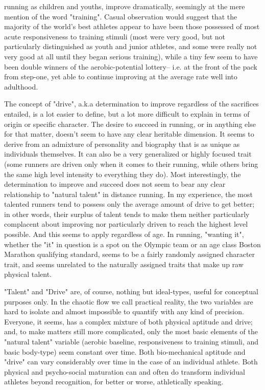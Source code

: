 running as children and youths, improve dramatically, seemingly at the mere mention of the word "training". Casual observation would suggest that the majority of the world's best athletes appear to have been those possessed of most acute responsiveness to training stimuli (most were very good, but not particularly distinguished as youth and junior athletes, and some were really not very good at all until they began serious training), while a tiny few seem to have been double winners of the aerobic-potential lottery-- i.e. at the front of the pack from step-one, yet able to continue improving at the average rate well into adulthood.

The concept of "drive", a.k.a determination to improve regardless of the sacrifices entailed, is a lot easier to define, but a lot more difficult to explain in terms of origin or specific character. The desire to succeed in running, or in anything else for that matter, doesn't seem to have any clear heritable dimension. It seems to derive from an admixture of personality and biography that is as unique as individuals themselves. It can also be a very generalized or highly focused trait (some runners are driven only when it comes to their running, while others bring the same high level intensity to everything they do). Most interestingly, the determination to improve and succeed does not seem to bear any clear relationship to "natural talent" in distance running. In my experience, the most talented runners tend to possess only the average amount of drive to get better; in other words, their surplus of talent tends to make them neither particularly complacent about improving nor particularly driven to reach the highest level possible. And this seems to apply regardless of age. In running, "wanting it", whether the "it" in question is a spot on the Olympic team or an age class Boston Marathon qualifying standard, seems to be a fairly randomly assigned character trait, and seems unrelated to the naturally assigned traits that make up raw physical talent.

"Talent" and "Drive" are, of course, nothing but ideal-types, useful for conceptual purposes only. In the chaotic flow we call practical reality, the two variables are hard to isolate and almost impossible to quantify with any kind of precision. Everyone, it seems, has a complex mixture of both physical aptitude and drive; and, to make matters still more complicated, only the most basic elements of the "natural talent" variable (aerobic baseline, responsiveness to training stimuli, and basic body-type) seem constant over time. Both bio-mechanical aptitude and "drive" can vary considerably over time in the case of an individual athlete. Both physical and psycho-social maturation can and often do transform individual athletes beyond recognition, for better or worse, athletically speaking.

